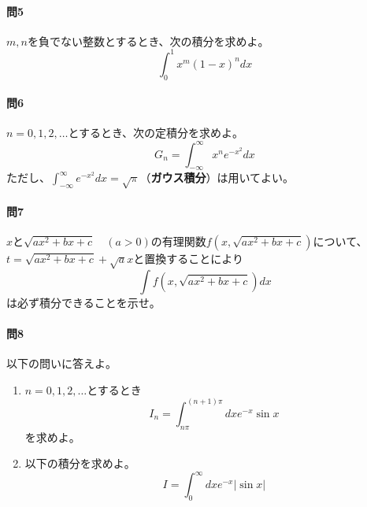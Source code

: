 \documentclass[a4j,dvipdfmx]{jsarticle}
\begin{document}
            \paragraph{問5}$m,n$を負でない整数とするとき、次の積分を求めよ。
                \begin{equation*}
                    \int_0^1 x^m(1-x)^ndx
                \end{equation*}

            \paragraph{問6}$n=0,1,2,\dots$とするとき、次の定積分を求めよ。
                \begin{equation*}
                    G_{n}=\int_{-\infty}^{\infty}x^{n}e^{-x^2}dx
                \end{equation*}
                ただし、$\displaystyle \int_{-\infty}^{\infty}e^{-x^2}dx=\sqrt{\pi}$（\textbf{ガウス積分}）は用いてよい。

            \paragraph{問7}$x$と$\sqrt{ax^2+bx+c}\quad(a>0)$の有理関数$f(x,\sqrt{ax^2+bx+c})$について、$t=\sqrt{ax^2+bx+c}+\sqrt{a}x$と置換することにより
                \begin{equation*}
                    \int f(x,\sqrt{ax^2+bx+c})dx
                \end{equation*}
                は必ず積分できることを示せ。
            \clearpage
            \paragraph{問8}以下の問いに答えよ。
            \begin{enumerate}\setcounter{enumi}{0}\renewcommand{\labelenumi}{(\arabic{enumi})}
                \item $n=0,1,2,\dots$とするとき
                    \begin{equation*}
                        I_n=\int_{n\pi}^{(n+1)\pi}dxe^{-x}\sin x
                    \end{equation*}を求めよ。
                \item 以下の積分を求めよ。
                    \begin{equation*}
                        I=\int_{0}^{\infty}dx e^{-x}|\sin x|
                        \end{equation*}
            \end{enumerate}
\end{document}
